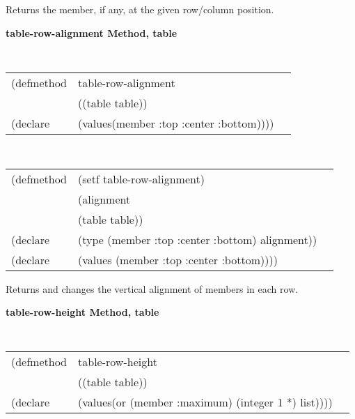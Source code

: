 \begin{flushright} \parbox[t]{6.125in}{
Returns the member, if any, at the given row/column position.

}\end{flushright}

	  
{\samepage
{\large {\bf table-row-alignment \hfill Method, table}}
\begin{flushright} \parbox[t]{6.125in}{
\tt
\begin{tabular}{lll}
\raggedright
(defmethod & table-row-alignment & \\
& ((table  table)) \\
(declare & (values(member :top :center :bottom))))
\end{tabular}
\rm

}\end{flushright}}

{\samepage
\begin{flushright} \parbox[t]{6.125in}{
\tt
\begin{tabular}{lll}
\raggedright
(defmethod & (setf table-row-alignment) & \\
         & (alignment \\
         & (table table)) \\
(declare &(type (member :top :center :bottom)  alignment))\\
(declare & (values (member :top :center :bottom))))
\end{tabular}
\rm
}
\end{flushright}}


\begin{flushright} \parbox[t]{6.125in}{
Returns and changes the vertical alignment of members in each row.

}\end{flushright}

	  
{\samepage
{\large {\bf table-row-height \hfill Method, table}}
\begin{flushright} \parbox[t]{6.125in}{
\tt
\begin{tabular}{lll}
\raggedright
(defmethod & table-row-height & \\
& ((table  table)) \\
(declare & (values(or (member :maximum) (integer 1 *) list))))
\end{tabular}
\rm

}\end{flushright}}


